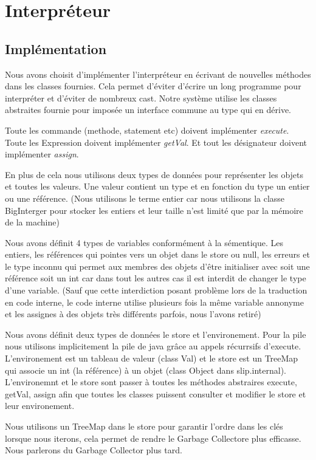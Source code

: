 \chapter{Interpréteur}
\section{Implémentation}
Nous avons choisit d'implémenter l'interpréteur en écrivant de nouvelles méthodes dans les classes fournies. Cela permet d'éviter d'écrire un long programme pour interpréter et d'éviter de nombreux cast. Notre système utilise les classes abstraites fournie pour imposée un interface commune au type qui en dérive. 

Toute les commande (methode, statement etc) doivent implémenter \textit{execute}. 
Toute les Expression doivent implémenter \textit{getVal}.
Et tout les désignateur doivent implémenter \textit{assign}.

En plus de cela nous utilisons deux types de données pour représenter les objets et toutes les valeurs. 
Une valeur contient un type et en fonction du type un entier ou une référence.
(Nous utilisons le terme entier car nous utilisons la classe BigInterger pour stocker les entiers et leur taille n'est limité que par la mémoire de la machine)

Nous avons définit 4 types de variables conformément à la sémentique. 
Les entiers, les références qui pointes vers un objet dans le store ou null, les erreurs et le type inconnu qui permet aux membres des objets d'être initialiser avec soit une référence soit un int car dans tout les autres cas il est interdit de changer le type d'une variable. (Sauf que cette interdiction posant problème lors de la traduction en code interne, le code interne utilise plusieurs fois la même variable annonyme et les assignes à des objets très différents parfois, nous l'avons retiré) 


Nous avons définit deux types de données le store et l'environement. Pour la pile nous utilisons implicitement la pile de java grâce au appels récurrsifs d'execute. L'environement est un tableau de valeur (class Val) et le store est un TreeMap qui associe un int (la référence) à un objet (class Object dans slip.internal). L'environemnt et le store sont passer à toutes les méthodes abstraires execute, getVal, assign afin que toutes les classes puissent consulter et modifier le store et leur environement.

Nous utilisons un TreeMap dans le store pour garantir l'ordre dans les clés lorsque nous iterons, cela permet de rendre le Garbage Collectore plus efficasse. Nous parlerons du Garbage Collector plus tard.

